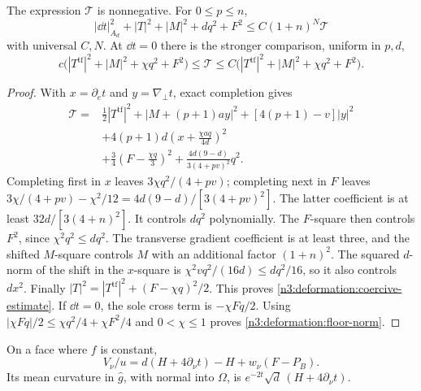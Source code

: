 \begin{lemma}\label{n3:deformation:coercivity}
The expression $\mathcal T$ is nonnegative. For $0\le p\le n$,
\begin{equation}\label{n3:deformation:coercive-estimate}
 |\dd t|_{A_d}^2+|T|^2+|M|^2+dq^2+F^2
 \le C(1+n)^N\mathcal T
\end{equation}
with universal $C,N$.
At $\dd t=0$ there is the stronger comparison, uniform in $p,d$,
\begin{equation}\label{n3:deformation:floor-norm}
 c\bigl(|T^{\operatorname{tf}}|^2+|M|^2+\chi q^2+F^2\bigr)
 \le\mathcal T
 \le C\bigl(|T^{\operatorname{tf}}|^2+|M|^2+\chi q^2+F^2\bigr).
\end{equation}
\end{lemma}

\begin{proof}
With $x=\partial_e t$ and $y=\nabla_\perp t$, exact completion gives
\begin{equation}\label{n3:deformation:square-completion}
 \begin{split}
 \mathcal T={}&\tfrac12|T^{\operatorname{tf}}|^2
 +|M+(p+1)ay|^2+[4(p+1)-v]|y|^2\\
 &+4(p+1)d\left(x+\frac{\chi aq}{4d}\right)^2\\
 &+\tfrac34\left(F-\frac{\chi q}{3}\right)^2
 +\frac{4d(9-d)}{3(4+pv)^2}q^2.
 \end{split}
\end{equation}
Completing first in $x$ leaves $3\chi q^2/(4+pv)$; completing next in
$F$ leaves $3\chi/(4+pv)-\chi^2/12=4d(9-d)/[3(4+pv)^2]$.
The latter coefficient is at least $32d/[3(4+n)^2]$.
It controls $dq^2$ polynomially. The $F$-square then controls $F^2$,
since $\chi^2q^2\le dq^2$.
The transverse gradient coefficient is at least three, and the shifted
$M$-square controls $M$ with an additional factor $(1+n)^2$.
The squared $d$-norm of the shift in the $x$-square is
$\chi^2vq^2/(16d)\le dq^2/16$, so it also controls $dx^2$.
Finally $|T|^2=|T^{\operatorname{tf}}|^2+(F-\chi q)^2/2$.
This proves \eqref{n3:deformation:coercive-estimate}.
If $\dd t=0$, the sole cross term is $-\chi Fq/2$.
Using $|\chi Fq|/2\le\chi q^2/4+\chi F^2/4$ and $0<\chi\le1$
proves \eqref{n3:deformation:floor-norm}.
\end{proof}

\begin{lemma}\label{n3:deformation:boundary-identity}
On a face where $f$ is constant,
\begin{equation}\label{n3:deformation:boundary}
 V_\nu/u=d(H+4\partial_\nu t)-H+w_\nu(F-P_B).
\end{equation}
Its mean curvature in $\hat g$, with normal into $\Omega$, is
$e^{-2t}\sqrt d\,(H+4\partial_\nu t)$.
\end{lemma}

